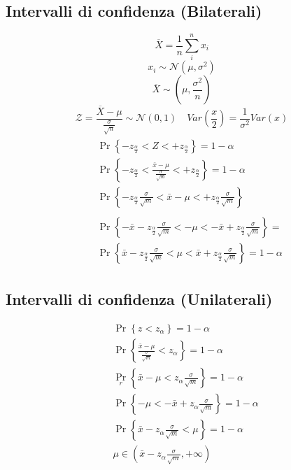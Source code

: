 \documentclass[]{article}
\begin{document}
    \subsection{Intervalli di confidenza (Bilaterali)}
    \[ \overline{X} = \frac{1}{n} \sum_{i}^{n} x_i \]
    \[ x_i \sim \mathcal{N}(\mu, \sigma^2) \]
    \[ \overline{X} \sim(\mu, \frac{\sigma^2}{n}) \]
    \[ \mathcal{Z} = \frac{\overline{X} - \mu}{\frac{\sigma}{\sqrt{n}}} \sim \mathcal{N}(0, 1) \quad Var(\frac{x}{2}) = \frac{1}{\sigma^2} Var(x) \]
    \begin{equation*}
        \begin{aligned}
            &\begin{aligned}
            & \operatorname{Pr}\left\{-z_{\frac{\alpha}{2}}<Z<+z_{\frac{\alpha}{2}}\right\}=1-\alpha \\
            & \operatorname{Pr}\left\{-z_{\frac{\alpha}{2}}<\frac{\bar{x}-\mu}{\frac{\sigma}{\sqrt{m}}}<+z_{\frac{\alpha}{2}}\right\}=1-\alpha \\
                & \operatorname{Pr}\left\{-z_{\frac{\alpha}{2}} \frac{\sigma}{\sqrt{m}}<\bar{x}-\mu<+z_{\frac{\alpha}{2}} \frac{\sigma}{\sqrt{m}}\right\}
        \end{aligned}\\
        &\begin{aligned}
        & \operatorname{Pr}\left\{-\bar{x}-z_{\frac{\alpha}{2}} \frac{\sigma}{\sqrt{m}}<-\mu<-\bar{x}+z_{\frac{\alpha}{2}} \frac{\sigma}{\sqrt{m}}\right\}= \\
        & \operatorname{Pr}\left\{\bar{x}-z_{\frac{\alpha}{2}} \frac{\sigma}{\sqrt{m}}<\mu<\bar{x}+z_{\frac{\alpha}{2}} \frac{\sigma}{\sqrt{m}}\right\}=1-\alpha
        \end{aligned}
        \end{aligned}
    \end{equation*}
    \subsection{Intervalli di confidenza (Unilaterali)}
    \begin{equation*}
        \begin{aligned}
        & \operatorname{Pr}\left\{z<z_\alpha\right\}=1-\alpha \\
        & \operatorname{Pr}\left\{\frac{\bar{x}-\mu}{\frac{\sigma}{\sqrt{m}}}<z_\alpha\right\}=1-\alpha \\
        & \operatorname{Pr}_r\left\{\bar{x}-\mu<z_\alpha \frac{\sigma}{\sqrt{m}}\right\}=1-\alpha \\
        & \operatorname{Pr}\left\{-\mu<-\bar{x}+z_\alpha \frac{\sigma}{\sqrt{m}}\right\}=1-\alpha \\
        & \operatorname{Pr}\left\{\bar{x}-z_\alpha \frac{\sigma}{\sqrt{m}}<\mu\right\}=1-\alpha \\
        & \mu \in\left(\bar{x}-z_\alpha \frac{\sigma}{\sqrt{m}},+\infty\right)
        \end{aligned}
    \end{equation*}
\end{document}
